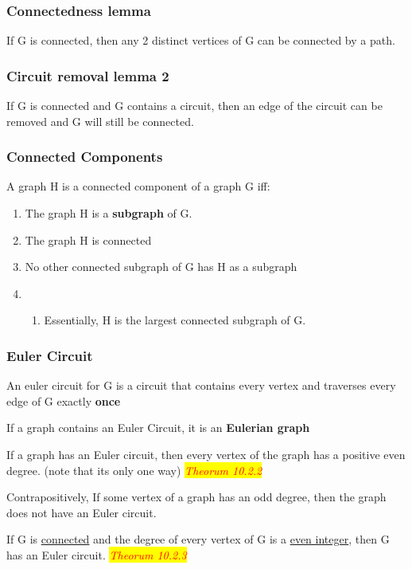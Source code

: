 \documentclass{article}
\newcommand{\theorum}[1]{\quad \quad \colorbox{yellow}{\textit{\textcolor{red}{Theorum #1}}}}
\newcommand{\sbreak}{\vspace{10pt}}
\begin{document}
\subsubsection{Connectedness lemma}
If G is connected, then any 2 distinct vertices of G can be connected by a path.

\subsubsection{Circuit removal lemma 2}
If G is connected and G contains a circuit, then an edge of the circuit can be removed and G will still be connected.

\subsubsection{Connected Components}
A graph H is a connected component of a graph G iff:
\begin{enumerate}
    \item The graph H is a \textbf{subgraph} of G.
    \item The graph H is connected
    \item No other connected subgraph of G has H as a subgraph
    \item \begin{enumerate}
        \item Essentially, H is the largest connected subgraph of G.
    \end{enumerate}
\end{enumerate}

\subsubsection{Euler Circuit}
An euler circuit for G is a circuit that contains every vertex and traverses every edge of G exactly \textbf{once}

If a graph contains an Euler Circuit, it is an \textbf{Eulerian graph}

\sbreak

If a graph has an Euler circuit, then every vertex of the graph has a positive even degree. (note that its only one way) \theorum{10.2.2}

Contrapositively, If some vertex of a graph has an odd degree, then the graph does not have an Euler circuit.

\sbreak

If G is \underline{connected} and the degree of every vertex of G is a \underline{even integer}, then G has an Euler circuit. \theorum{10.2.3}
\end{document}
